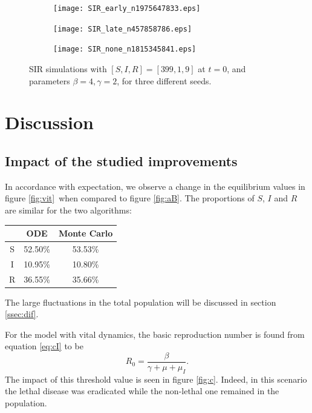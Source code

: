 \documentclass[a4paper,10pt,twocolumn]{article}
\begin{document}
\begin{figure}
	\centering
	\begin{subfigure}{0.33\linewidth}
		\centering
		\texttt{[image: SIR\_early\_n1975647833.eps]}
	\end{subfigure}%
	\begin{subfigure}{0.33\linewidth}
		\centering
		\texttt{[image: SIR\_late\_n457858786.eps]}
	\end{subfigure}%
	\begin{subfigure}{0.33\linewidth}
		\centering
		\texttt{[image: SIR\_none\_n1815345841.eps]}
	\end{subfigure}%
	\caption{SIR simulations with $[S,I,R] = [399,1,9]$ at $t=0$, and parameters $\beta = 4, \gamma = 2$, for three different seeds.}
	\label{fig:seed}
\end{figure}


	 




%
%
%
\section{Discussion}






\subsection{Impact of the studied improvements}


In accordance with expectation, we observe a change in the equilibrium values in figure \ref{fig:vit} when compared to figure \ref{fig:aB}. The proportions of $S$, $I$ and $R$ are similar for the two algorithms:
\begin{center}
\begin{tabular}{ccc}\hline
& ODE & Monte Carlo	\\\hline
S & 52.50\% & 53.53\% \\
I & 10.95\% & 10.80\% \\
R & 36.55\% & 35.66\%  \\\hline
\end{tabular}
\end{center}
The large fluctuations in the total population will be discussed in section \ref{ssec:dif}. 

For the model with vital dynamics, the basic reproduction number is found from equation \ref{eq:cI} to be 
\[
R_0 = \frac{\beta}{\gamma + \mu + \mu_I}.
\]
The impact of this threshold value is seen  in figure \ref{fig:c}. Indeed, in this scenario the lethal disease was eradicated while the non-lethal one remained in the population. 
\end{document}
